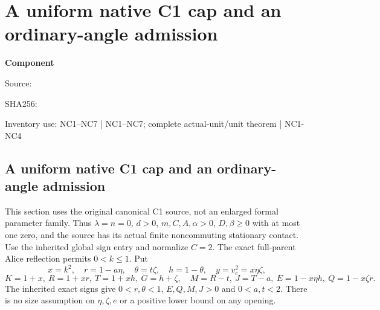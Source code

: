 \chapter{A uniform native C1 cap and an ordinary-angle admission}
\label{component:p42ee07a067c1}
\noindent\textbf{Component }\par
{\small\noindent Source: \par}
{\small\noindent SHA256: \par}
{\small\noindent Inventory use: NC1--NC7 | NC1--NC7; complete actual-unit/unit theorem | NC1-NC4\par}
\medskip
\section[A uniform native C1 cap and an ordinary-angle admission]{A uniform native C1 cap and an ordinary-angle admission}
\label{p42ee07a067c1:sec:c1-global-native-cap}

This section uses the original canonical C1 source, not an enlarged
formal parameter family. Thus $\lambda=n=0$, $d>0$, $m,C,A,\alpha>0$,
$D,\beta\ge0$ with at most one zero, and the source has its actual
finite noncommuting stationary contact. Use the inherited global sign
entry and normalize $C=2$. The exact full-parent Alice reflection
permits $0<k\le1$. Put
\[
 x=k^2,\quad r=1-a\eta,\quad\theta=t\zeta,\quad
 h=1-\theta,\quad y=v_c^2=x\eta\zeta,
\]
\[
 K=1+x,\ R=1+xr,\ T=1+xh,\ G=h+\zeta,
 \quad M=R-t,\ J=T-a,\ E=1-x\eta h,\ Q=1-x\zeta r.
 \tag{NC1}
\]
The inherited exact signs give $0<r,\theta<1$, $E,Q,M,J>0$ and
$0<a,t<2$. There is no size assumption on $\eta,\zeta,e$ or a
positive lower bound on any opening.

